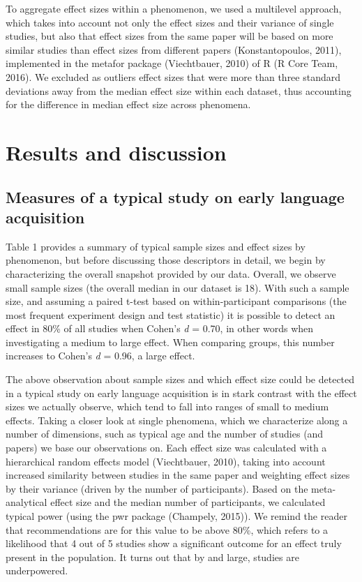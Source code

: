 \documentclass[english,floatsintext,man]{apa6}
\begin{document}
To aggregate effect sizes within a phenomenon, we used a multilevel
approach, which takes into account not only the effect sizes and their
variance of single studies, but also that effect sizes from the same
paper will be based on more similar studies than effect sizes from
different papers (Konstantopoulos, 2011), implemented in the metafor
package (Viechtbauer, 2010) of R (R Core Team, 2016). We excluded as
outliers effect sizes that were more than three standard deviations away
from the median effect size within each dataset, thus accounting for the
difference in median effect size across phenomena.

\section{Results and discussion}\label{results-and-discussion}

\subsection{Measures of a typical study on early language
acquisition}\label{measures-of-a-typical-study-on-early-language-acquisition}

Table 1 provides a summary of typical sample sizes and effect sizes by
phenomenon, but before discussing those descriptors in detail, we begin
by characterizing the overall snapshot provided by our data. Overall, we
observe small sample sizes (the overall median in our dataset is 18).
With such a sample size, and assuming a paired t-test based on
within-participant comparisons (the most frequent experiment design and
test statistic) it is possible to detect an effect in 80\% of all
studies when Cohen's \emph{d} = 0.70, in other words when investigating
a medium to large effect. When comparing groups, this number increases
to Cohen's \emph{d} = 0.96, a large effect.

The above observation about sample sizes and which effect size could be
detected in a typical study on early language acquisition is in stark
contrast with the effect sizes we actually observe, which tend to fall
into ranges of small to medium effects. Taking a closer look at single
phenomena, which we characterize along a number of dimensions, such as
typical age and the number of studies (and papers) we base our
observations on. Each effect size was calculated with a hierarchical
random effects model (Viechtbauer, 2010), taking into account increased
similarity between studies in the same paper and weighting effect sizes
by their variance (driven by the number of participants). Based on the
meta-analytical effect size and the median number of participants, we
calculated typical power (using the pwr package (Champely, 2015)). We
remind the reader that recommendations are for this value to be above
80\%, which refers to a likelihood that 4 out of 5 studies show a
significant outcome for an effect truly present in the population. It
turns out that by and large, studies are underpowered.
\end{document}
